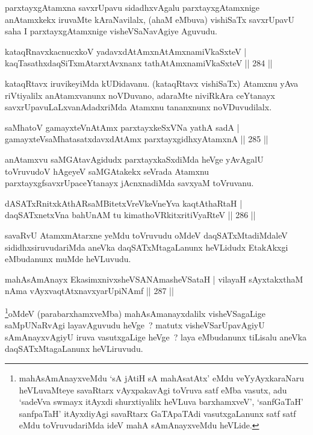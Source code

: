\begin{artha}
parxtayxgAtamxna savxrUpavu sidadhxvAgalu parxtayxgAtamxnige anAtamxkekx iruvaMte kAraNavilalx, (ahaM eMbuva) vishiSaTx savxrUpavU saha I parxtayxgAtamxnige visheVSaNavAgiye Aguvudu.
\end{artha}

\begin{shl}
kataqRnavxkacnucxkoV yadavxdAtAmx\s nAtAmxnamiVkaSxteV |
kaqTasathxdaqSiTxmAtarxtAvxnanx tathA\s \s tAmxnamiVkaSxteV \hfill || 284 ||
\end{shl}

\begin{artha}
kataqRtavx iruvikeyiMda kUDidavanu. (kataqRtavx vishiSaTx) Atamxnu yAva riVtiyalilx anAtamxvanunx noVDuvano, adaraMte niviRkAra ceYtanayx savxrUpavuLaLxvanAdadxriMda Atamxnu tananxnunx noVDuvudilalx.
\end{artha}

\begin{shl}
saMhatoV gamayxteV\s nAtAmx parxtayxkeSxVNa yathA sadA |
gamayxteV\s saMhatasatxdavxdAtAmx parxtayxgidhxyA\s \s tamxnA \hfill || 285 ||
\end{shl}

\begin{artha}
anAtamxvu saMGAtavAgidudx parxtayxkaSxdiMda heVge yAvAgalU toVruvudoV hAgeyeV saMGAtakekx seVrada Atamxnu parxtayxgfsavxrUpaceYtanayx jAcnxnadiMda savxyaM toVruvanu.
\end{artha}

\begin{shl}
dASATxRnitxkAthARsaMBitetxVreVkeVneYva kaqtAthaRtaH |
daqSATxnetxVna bahUnAM tu kimathoVRkitxritiVyaRteV \hfill || 286 ||
\end{shl}

\begin{artha}
savaRvU AtamxmAtarxne yeMdu toVruvudu oMdeV daqSATxMtadiMdaleV sididhxsiruvudariMda aneVka daqSATxMtagaLanunx heVLidudx EtakAkxgi eMbudanunx muMde heVLuvudu.
\end{artha}

\begin{shl}
mahAsAmAnayx EkasimxnivxsheVSANAmasheVSataH |
vilayaH sAyxtakxthaM nAma vAyxvaqtAtxnavxyarUpiNAmf \hfill || 287 ||
\end{shl}

\begin{artha}
\footnote{mahAsAmAnayxveMdu `sA jAtiH sA mahAsatAtx' eMdu veYyAyxkaraNaru heVLuvaMteye savaRtarx vAyxpakavAgi toVruva satf eMba vasutx, adu `sadeVva swmayx itAyxdi shurxtiyalilx heVLuva barxhamxveV', `sanfGaTaH' sanfpaTaH' itAyxdiyAgi savaRtarx GaTApaTAdi vasutxgaLanunx satf satf eMdu toVruvudariMda ideV mahA sAmAnayxveMdu heVLide.}oMdeV (parabarxhamxveMba) mahAsAmanayxdalilx visheVSagaLige saMpUNaRvAgi layavAguvudu heVge~? matutx visheVSarUpavAgiyU sAmAnayxvAgiyU iruva vasutxgaLige heVge~? laya eMbudanunx tiLisalu aneVka daqSATxMtagaLanunx heVLiruvudu.
\end{artha}

